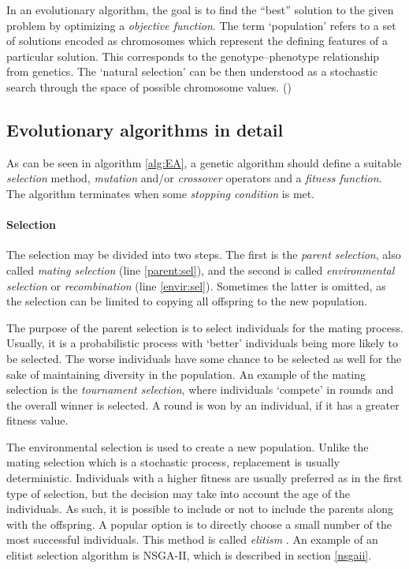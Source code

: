 In an evolutionary algorithm, the goal is to find the ``best'' solution 
to the given problem by optimizing a \emph{objective function}. The term
`population' refers to a set of solutions encoded as chromosomes which 
represent the defining features of a particular solution. This corresponds
to the genotype--phenotype relationship from genetics. The `natural selection'
can be then understood as a stochastic search through the space of possible 
chromosome values. 
(\cite{Engelbrecht:2007:CII:1557464})

\subsection{Evolutionary algorithms in detail}
As can be seen in algorithm \ref{alg:EA}, a genetic algorithm should 
define a suitable \emph{selection} method, \emph{mutation} and/or 
\emph{crossover} operators and a \emph{fitness function}.
The algorithm terminates when some \emph{stopping condition} is met. 

\paragraph{Selection}
The selection may be divided into two steps. The first is the 
\emph{parent selection}, also called \emph{mating selection}
(line \ref{parent:sel}), and the second is called
\emph{environmental selection} or \emph{recombination} (line \ref{envir:sel}).
Sometimes the latter is omitted, as the selection can be limited to copying 
all offspring to the new population.

The purpose of the parent selection is to select individuals for the
mating process. Usually, it is a probabilistic process with `better'
individuals being more likely to be selected. The worse individuals have some
chance to be selected as well for the sake of maintaining diversity in the
population. An example of the mating selection is the
\emph{tournament selection}, where individuals `compete' in rounds and the
overall winner is selected. A round is won by an individual, if it has a 
greater fitness value.

The environmental selection is used to create a new 
population. Unlike the mating selection which is a stochastic process,
replacement is usually deterministic. Individuals with a higher fitness are
usually preferred as in the first type of selection, but the decision may take 
into account the age of the individuals. As such, it is possible to include 
or not to include the parents along with the offspring. A popular option is to 
directly choose a small number of the most successful individuals. This method 
is called \emph{elitism} \citep{Eiben:2015:IEC:2810085}.
An example of an elitist selection algorithm is NSGA-II, which
is described in section \ref{nsgaii}.

